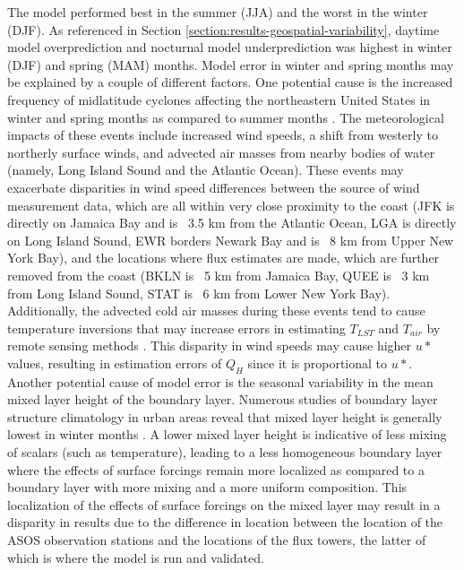 The model performed best in the summer (JJA) and the worst in the winter (DJF). As referenced in Section \ref{section:results-geospatial-variability}, daytime model overprediction and nocturnal model underprediction was highest in winter (DJF) and spring (MAM) months. Model error in winter and spring months may be explained by a couple of different factors. One potential cause is the increased frequency of midlatitude cyclones affecting the northeastern United States in winter and spring months as compared to summer months \citep{Gedzelman_2003}. The meteorological impacts of these events include increased wind speeds, a shift from westerly to northerly surface winds, and advected air masses from nearby bodies of water (namely, Long Island Sound and the Atlantic Ocean). These events may exacerbate disparities in wind speed differences between the source of wind measurement data, which are all within very close proximity to the coast (JFK is directly on Jamaica Bay and is ~3.5 km from the Atlantic Ocean, LGA is directly on Long Island Sound, EWR borders Newark Bay and is ~8 km from Upper New York Bay), and the locations where flux estimates are made, which are further removed from the coast (BKLN is ~5 km from Jamaica Bay, QUEE is ~3 km from Long Island Sound, STAT is ~6 km from Lower New York Bay). Additionally, the advected cold air masses during these events tend to cause temperature inversions that may increase errors in estimating $T_{LST}$ and $T_{air}$ by remote sensing methods \citep{Tang_2016}. This disparity in wind speeds may cause higher $u*$ values, resulting in estimation errors of $Q_H$ since it is proportional to $u*$. Another potential cause of model error is the seasonal variability in the mean mixed layer height of the boundary layer. Numerous studies of boundary layer structure climatology in urban areas reveal that mixed layer height is generally lowest in winter months \citep{Kamp_2010, Moreira_2020}. A lower mixed layer height is indicative of less mixing of scalars (such as temperature), leading to a less homogeneous boundary layer where the effects of surface forcings remain more localized as compared to a boundary layer with more mixing and a more uniform composition. This localization of the effects of surface forcings on the mixed layer may result in a disparity in results due to the difference in location between the location of the ASOS observation stations and the locations of the flux towers, the latter of which is where the model is run and validated.

